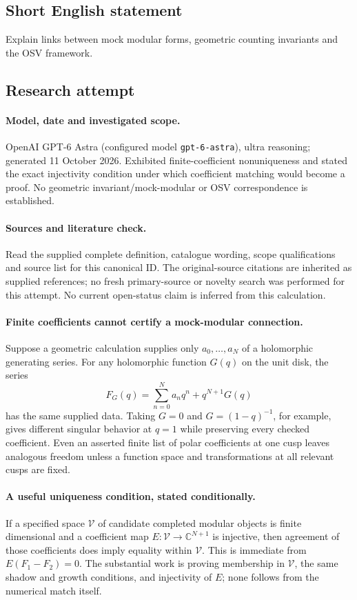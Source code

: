 \documentclass[11pt]{article}
\begin{document}
\subsection{Short English statement}
Explain links between mock modular forms, geometric counting invariants and the OSV framework.
\subsection{Research attempt}
\paragraph{Model, date and investigated scope.}
OpenAI GPT-6 Astra (configured model \texttt{gpt-6-astra}), ultra reasoning; generated 11 October 2026. Exhibited finite-coefficient nonuniqueness and stated the exact injectivity condition under which coefficient matching would become a proof. No geometric invariant/mock-modular or OSV correspondence is established.

\paragraph{Sources and literature check.}
Read the supplied complete definition, catalogue wording, scope qualifications and source list for this canonical ID. The original-source citations are inherited as supplied references; no fresh primary-source or novelty search was performed for this attempt. No current open-status claim is inferred from this calculation.

\paragraph{Finite coefficients cannot certify a mock-modular connection.}Suppose a geometric calculation supplies only \(a_0,\ldots,a_N\) of a holomorphic generating series. For any holomorphic function \(G(q)\) on the unit disk, the series
\[F_G(q)=\sum_{n=0}^Na_nq^n+q^{N+1}G(q)
\]
has the same supplied data. Taking \(G=0\) and \(G=(1-q)^{-1}\), for example, gives different singular behavior at \(q=1\) while preserving every checked coefficient. Even an asserted finite list of polar coefficients at one cusp leaves analogous freedom unless a function space and transformations at all relevant cusps are fixed.
\paragraph{A useful uniqueness condition, stated conditionally.}If a specified space \(\mathcal V\) of candidate completed modular objects is finite dimensional and a coefficient map \(E:\mathcal V\to\mathbb C^{N+1}\) is injective, then agreement of those coefficients does imply equality within \(\mathcal V\). This is immediate from \(E(F_1-F_2)=0\). The substantial work is proving membership in \(\mathcal V\), the same shadow and growth conditions, and injectivity of \(E\); none follows from the numerical match itself.
\end{document}
